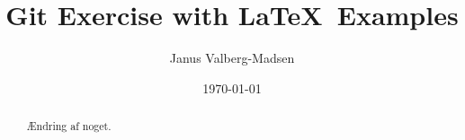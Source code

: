 \documentclass[10pt,a4paper]{article}
\title{Git Exercise with \LaTeX\ Examples}
\author{Janus Valberg-Madsen}
\date{\today}
\begin{document}
\maketitle

\begin{abstract}
  
Ændring af noget.
\end{abstract}

\tableofcontents



\end{document}
